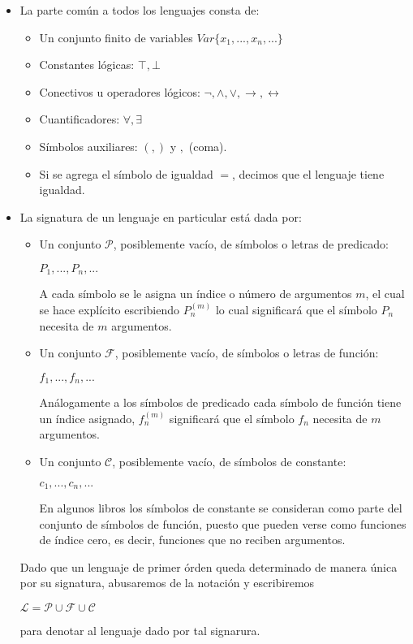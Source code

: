 \documentclass[letterpaper,12pt]{article}
\begin{document}
    \begin{itemize}
      \item La parte común a todos los lenguajes consta de:
      \begin{itemize}
        \item Un conjunto finito de variables 
        \texttt{$Var \{x_{1}, ..., x_{n},...\}$}
        \item Constantes lógicas: $\top, \bot$
        \item Conectivos u operadores lógicos: 
        $\neg, \land, \lor, \rightarrow, \leftrightarrow$
        \item Cuantificadores: $\forall, \exists$
        \item Símbolos auxiliares: $(, )$ y $,$ (coma).
        \item Si se agrega el símbolo de igualdad $=$, decimos
        que el lenguaje tiene igualdad.
      \end{itemize}
      
      \item La signatura de un lenguaje en particular está dada por:
      \begin{itemize}
        \item Un conjunto $\mathcal{P}$, posiblemente vacío, de símbolos o 
        letras de predicado:
        \begin{center}
          $P_{1}, ..., P_{n}, ...$
        \end{center}
        A cada símbolo se le asigna un índice o número de argumentos $m$, el 
        cual se hace explícito escribiendo $P_{n}^{(m)}$ lo cual significará 
        que el símbolo $P_{n}$ necesita de $m$ argumentos.
        \item Un conjunto $\mathcal{F}$, posiblemente vacío, de símbolos o 
        letras de función:
        \begin{center}
          $f_{1},..., f_{n},...$
        \end{center}
        Análogamente a los símbolos de predicado cada símbolo de función tiene 
        un índice asignado, $f_{n}^{(m)}$ significará que el símbolo $f_{n}$ 
        necesita de $m$ argumentos.       
        \item Un conjunto $\mathcal{C}$, posiblemente vacío, de símbolos de 
        constante:
        \begin{center}
          $c_{1}, ..., c_{n}, ...$
        \end{center}      
        En algunos libros los símbolos de constante se consideran como parte 
        del conjunto de símbolos de función, puesto que pueden verse como 
        funciones de índice cero, es decir, funciones que no reciben 
        argumentos.
      \end{itemize}
      
      Dado que un lenguaje de primer órden queda determinado de manera única
      por su signatura, abusaremos de la notación y escribiremos
      \begin{center}
        $\mathcal{L} = \mathcal{P} \cup \mathcal{F} \cup \mathcal{C}$
      \end{center}
      para denotar al lenguaje dado por tal signarura.
    \end{itemize}
    
\end{document}
